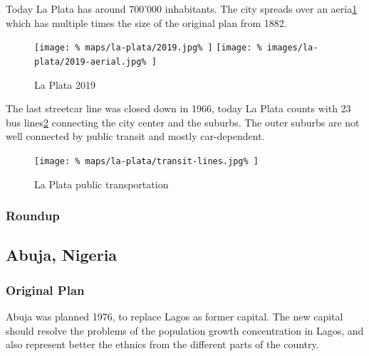 \documentclass[twocolumn]{article}
\begin{document}
			Today La Plata has around 700'000 inhabitants. The city spreads over an aeria\ref{fig:map:la-plata-2019} which has multiple times the size of the original plan from 1882.			
			
			\begin{figure}[H]
				\texttt{[image: \%
					maps/la-plata/2019.jpg\%
				]}
				\texttt{[image: \%
					images/la-plata/2019-aerial.jpg\%
				]}
				\caption{La Plata 2019\cite{OpenStreetMap:LaPlata}}
				\label{fig:map:la-plata-2019}
			\end{figure}
			
			The last streetcar line was closed down in 1966, today La Plata counts with 23 bus lines\ref{fig:map:la-plata-transit} connecting the city center and the suburbs.
			The outer suburbs are not well connected by public transit and mostly car-dependent.
			
			\begin{figure}[H]
				\texttt{[image: \%
					maps/la-plata/transit-lines.jpg\%
				]}
				\caption{La Plata public transportation\cite{OpenStreetMap:LaPlata}}
				\label{fig:map:la-plata-transit}
			\end{figure}
			
			
			
			\subsubsection{Roundup}
			
			
			
		\clearpage
		\begin{strip}
		\subsection{Abuja, Nigeria}
		\end{strip}
		
			
			
			\subsubsection{Original Plan}
			
			Abuja was planned 1976, to replace Lagos as former capital.
			The new capital should resolve the problems of the population growth concentration in Lagos, and also represent better the ethnics from the different parts of the country.
			
\end{document}
